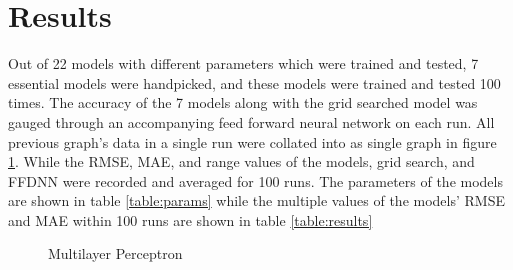 ﻿\documentclass[10pt,11pt,12pt,oneside]{book}
\begin{document}
\section{Results}
Out of 22 models with different parameters which were trained and tested, 7 essential models were handpicked, and these models were trained and tested 100 times. The accuracy of the 7 models along with the grid searched model was gauged through an accompanying feed forward neural network on each run. All previous graph's data in a single run were collated into as single graph in figure \ref{fig:all_graphs}. While the RMSE, MAE, and range values of the models, grid search, and FFDNN were recorded and averaged for 100 runs. The parameters of the models are shown in table \ref{table:params} while the multiple values of the models' RMSE and MAE within 100 runs are shown in table \ref{table:results}\\
\begin{figure}[H]
    \centering
    \qquad
    \caption{Multilayer Perceptron}%
    \label{fig:all_graphs}%
\end{figure}
\end{document}
